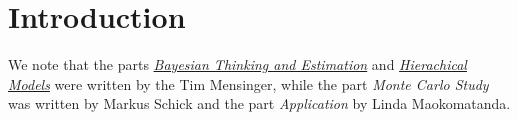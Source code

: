 \section{Introduction}

We note that the parts \hyperref[sec:bayesian_thinking]{\emph{Bayesian Thinking and Estimation}} and \hyperref[sec:hierachical_modeling]{\emph{Hierachical Models}} were written by the Tim Mensinger, while the part \emph{Monte Carlo Study} was written by Markus Schick and the part \emph{Application} by Linda Maokomatanda.
